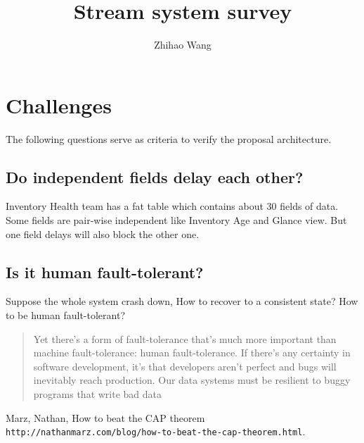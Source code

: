\documentclass[12pt]{article}
\title{Stream system survey}
\author{Zhihao Wang}
\begin{document}
\maketitle

\section{Challenges}
The following questions serve as criteria to verify the proposal architecture.

\subsection{Do independent fields delay each other?}
Inventory Health team has a fat table which contains about 30 fields of data. Some fields are pair-wise independent like Inventory Age and Glance view. But one field delays will also block the other one.

\subsection{Is it human fault-tolerant?}
Suppose the whole system crash down, How to recover to a consistent state? How to be human fault-tolerant?
\begin{quote}
Yet there's a form of fault-tolerance that's much more important than machine fault-tolerance: human fault-tolerance. If there's any certainty in software development, it's that developers aren't perfect and bugs will inevitably reach production. Our data systems must be resilient to buggy programs that write bad data \cite{latexcompanion}
\end{quote}

\begin{thebibliography}{9}
     Marz, Nathan, How to beat the CAP theorem \texttt{http://nathanmarz.com/blog/how-to-beat-the-cap-theorem.html}.
\end{thebibliography}
\end{document}
